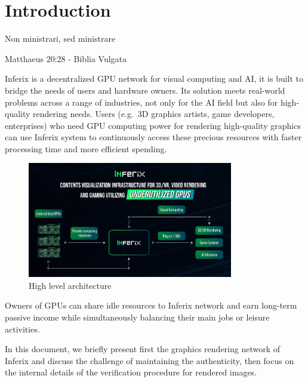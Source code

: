 \chapter{Introduction}
\label{ch:introduction}
\epigraph{Non ministrari, sed ministrare}{Matthaeus 20:28 - Biblia Vulgata}

Inferix is a decentralized GPU network for visual computing and AI, it is built to bridge the needs of users and hardware owners. Its solution meets real-world problems across a range of industries, not only for the AI field but also for high-quality rendering needs. Users (e.g.~3D graphics artists, game developers, enterprises) who need GPU computing power for rendering high-quality graphics can use Inferix system to continuously access these precious resources with faster processing time and more efficient spending.
\begin{figure}[h]
    \centering
    \includegraphics[width=0.8\textwidth]{inferix_high_level_architecture.jpg}
    \caption{High level architecture}
    \label{fig:inferix_rendering_network_high_level}
\end{figure}
Owners of GPUs can share idle resources to Inferix network and earn long-term passive income while simultaneously balancing their main jobs or leisure activities.

In this document, we briefly present first the graphics rendering network of Inferix and discuss the challenge of maintaining the authenticity, then focus on the internal details of the verification procedure for rendered images.



